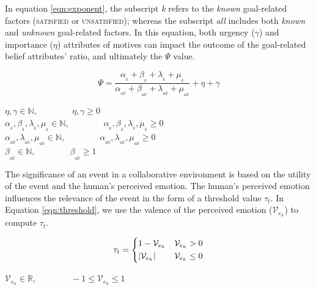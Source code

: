 \documentclass[12pt]{report}
\begin{document}
In equation \ref{eqn:exponent}, the subscript \textit{k} refers to the
\textit{known} goal-related factors (\textsc{satisfied} or
\textsc{unsatisfied}); whereas the subscript \textit{all} includes both
\textit{known} and \textit{unknown} goal-related factors. In this equation, both
urgency ($\gamma$) and importance ($\eta$) attributes of motives can impact the
outcome of the goal-related belief attributes' ratio, and ultimately the $\Psi$
value.

\begin{equation}
    \Psi = \frac{\alpha_{_k} + \beta_{_k} + \lambda_{_k} +
    \mu_{_k}}{\alpha_{_{all}} + \beta_{_{all}} + \lambda_{_{all}} +
    \mu_{_{all}}} + \eta + \gamma
    \label{eqn:exponent}
\end{equation}

\begin{center} 
    $\eta, \gamma \in \mathbb{N}, \qquad\qquad \eta, \gamma \geq 0$\\
    $\alpha_{_k}, \beta_{_k}, \lambda_{_k}, \mu_{_k} \in \mathbb{N},
    \qquad\qquad \alpha_{_k}, \beta_{_k}, \lambda_{_k}, \mu_{_k} \geq 0$\\
    $\alpha_{_{all}}, \lambda_{_{all}}, \mu_{_{all}} \in \mathbb{N},
    \qquad\qquad \alpha_{_{all}}, \lambda_{_{all}}, \mu_{_{all}} \geq 0$\\
    $\beta_{_{all}} \in \mathbb{N}, \qquad\qquad \beta_{_{all}} \geq 1$
\end{center}

The significance of an event in a collaborative environment is based on the
utility of the event and the human's perceived emotion. The human's perceived
emotion influences the relevance of the event in the form of a threshold value
$\tau_{t}$. In Equation \ref{eqn:threshold}, we use the valence of the perceived
emotion ($\mathcal{V}_{e_h}$) to compute $\tau_{t}$.

\begin{equation}
    \tau_{t}= 
    \begin{dcases}
       1-\mathcal{V}_{e_h} & \mathcal{V}_{e_h} > 0 \\
       |\mathcal{V}_{e_h}| & \mathcal{V}_{e_h} \leq  0
    \end{dcases}
    \label{eqn:threshold}
\end{equation}

\begin{center} 
    $\mathcal{V}_{e_h} \in \mathbb{R}, \qquad\qquad -1 \leq \mathcal{V}_{e_h}
    \leq 1$
\end{center}
\end{document}
